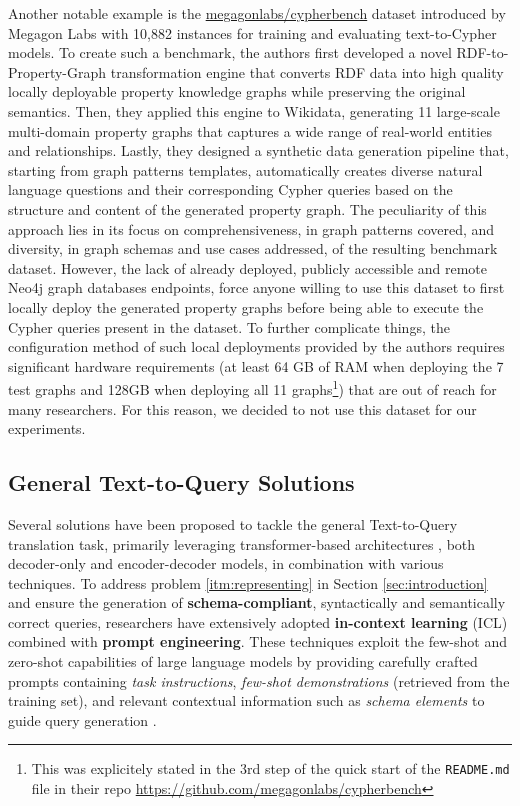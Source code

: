 Another notable example is the \href{https://huggingface.co/datasets/megagonlabs/cypherbench}{megagonlabs/cypherbench} dataset introduced by Megagon Labs \cite{cypherbench-megagonlabs-2024} with 10,882 instances for training and evaluating text-to-Cypher models. To create such a benchmark, the authors first developed a novel RDF-to-Property-Graph transformation engine that converts RDF data into high quality locally deployable property knowledge graphs while preserving the original semantics. Then, they applied this engine to Wikidata, generating 11 large-scale multi-domain property graphs that captures a wide range of real-world entities and relationships. Lastly, they designed a synthetic data generation pipeline that, starting from graph patterns templates, automatically creates diverse natural language questions and their corresponding Cypher queries based on the structure and content of the generated property graph. The peculiarity of this approach lies in its focus on comprehensiveness, in graph patterns covered, and diversity, in graph schemas and use cases addressed, of the resulting benchmark dataset. However, the lack of already deployed, publicly accessible and remote Neo4j graph databases endpoints, force anyone willing to use this dataset to first locally deploy the generated property graphs before being able to execute the Cypher queries present in the dataset. To further complicate things, the configuration method of such local deployments provided by the authors requires significant hardware requirements (at least 64 GB of RAM when deploying the 7 test graphs and 128GB when deploying all 11 graphs\footnote{This was explicitely stated in the 3rd step of the quick start of the \texttt{README.md} file in their repo \url{https://github.com/megagonlabs/cypherbench}}) that are out of reach for many researchers. For this reason, we decided to not use this dataset for our experiments.

\subsection{General Text-to-Query Solutions}
\label{sec:text-to-query-solutions}

Several solutions have been proposed to tackle the general Text-to-Query translation task, primarily leveraging transformer-based architectures \cite{vaswani-etal-2017-attention}, both decoder-only and encoder-decoder models, in combination with various techniques. %
%
To address problem \ref{itm:representing} in Section \ref{sec:introduction} and ensure the generation of \textbf{schema-compliant}, syntactically and semantically correct queries, researchers have extensively adopted \textbf{in-context learning} (ICL) combined with \textbf{prompt engineering}. These techniques exploit the few-shot and zero-shot capabilities of large language models by providing carefully crafted prompts containing \textit{task instructions}, \textit{few-shot demonstrations} (retrieved from the training set), and relevant contextual information such as \textit{schema elements} to guide query generation \cite{neo4jlabs-text2cypher-2024, longwell-etal-2024-triple-augmented, yang-etal-2026-enhancing, cypherbench-megagonlabs-2024, dabramo-etal-2025-investigating}.

